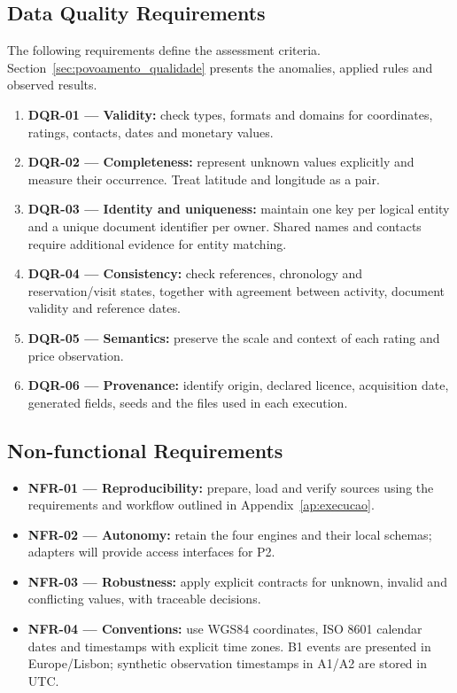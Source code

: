 \subsection{Data Quality Requirements}
The following requirements define the assessment criteria. Section~\ref{sec:povoamento_qualidade} presents the anomalies, applied rules and observed results.
\begin{enumerate}
\item \textbf{DQR-01 --- Validity:} check types, formats and domains for coordinates, ratings, contacts, dates and monetary values.
\item \textbf{DQR-02 --- Completeness:} represent unknown values explicitly and measure their occurrence. Treat latitude and longitude as a pair.
\item \textbf{DQR-03 --- Identity and uniqueness:} maintain one key per logical entity and a unique document identifier per owner. Shared names and contacts require additional evidence for entity matching.
\item \textbf{DQR-04 --- Consistency:} check references, chronology and reservation/visit states, together with agreement between activity, document validity and reference dates.
\item \textbf{DQR-05 --- Semantics:} preserve the scale and context of each rating and price observation.
\item \textbf{DQR-06 --- Provenance:} identify origin, declared licence, acquisition date, generated fields, seeds and the files used in each execution.
\end{enumerate}

\subsection{Non-functional Requirements}
\begin{itemize}
\item \textbf{NFR-01 --- Reproducibility:} prepare, load and verify sources using the requirements and workflow outlined in Appendix~\ref{ap:execucao}.
\item \textbf{NFR-02 --- Autonomy:} retain the four engines and their local schemas; adapters will provide access interfaces for P2.
\item \textbf{NFR-03 --- Robustness:} apply explicit contracts for unknown, invalid and conflicting values, with traceable decisions.
\item \textbf{NFR-04 --- Conventions:} use WGS84 coordinates, ISO 8601 calendar dates and timestamps with explicit time zones. B1 events are presented in Europe/Lisbon; synthetic observation timestamps in A1/A2 are stored in UTC.
\end{itemize}
